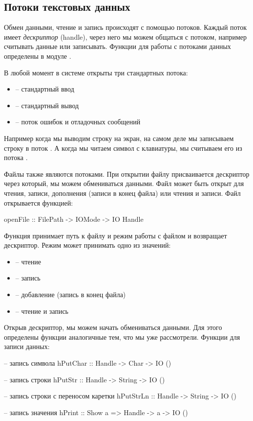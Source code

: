 \subsection{Потоки текстовых данных}

Обмен данными, чтение и запись происходят с помощью
потоков. Каждый поток имеет \emph{дескриптор} (handle),
через него мы можем общаться с потоком, например считывать 
данные или записывать. Функции для работы с потоками 
данных определены в модуле . 

В любой момент в системе открыты три стандартных потока:
\begin{itemize}
\item {}   -- стандартный ввод
\item {}  -- стандартный вывод
\item {}  -- поток ошибок и отладочных сообщений
\end{itemize}

Например когда мы выводим строку на экран, на самом деле
мы записываем строку в поток . А когда мы читаем
символ с клавиатуры, мы считываем его из потока .

Файлы также являются потоками. При открытии файлу
присваивается дескриптор через который, мы можем обмениваться 
данными. Файл может быть открыт для чтения, записи, 
дополнения (записи в конец файла) или чтения и записи. 
Файл открывается функцией:

\begin{code}
openFile :: FilePath -> IOMode -> IO Handle
\end{code}

Функция принимает путь к файлу и режим работы с файлом
и возвращает дескриптор. Режим может принимать одно из значений:

\begin{itemize}
\item {}         -- чтение
\item {}        -- запись
\item {}       -- добавление (запись в конец файла)
\item {}    -- чтение и запись
\end{itemize}

Открыв дескриптор, мы можем начать обмениваться данными.
Для этого определены функции аналогичные тем, что мы уже
рассмотрели. Функции для записи данных:

\begin{code}
-- запись символа
hPutChar :: Handle -> Char -> IO ()

-- запись строки
hPutStr :: Handle -> String -> IO ()

-- запись строки с переносом каретки
hPutStrLn :: Handle -> String -> IO ()

-- запись значения
hPrint :: Show a => Handle -> a -> IO ()
\end{code}

